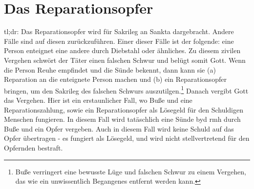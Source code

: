 \chapter{\label{app:reparationsopfer}Das Reparationsopfer}
tl;dr:
Das Reparationsopfer wird für Sakrileg an Sankta dargebracht.
Andere Fälle sind auf diesen zurückzuführen.
Einer dieser Fälle ist der folgende: eine Person enteignet eine andere durch Diebstahl oder ähnliches.
Zu diesem zivilen Vergehen schwört der Täter einen falschen Schwur und belügt somit Gott.
Wenn die Person Reuhe empfindet und die Sünde bekennt, dann kann sie (a) Reparation an die enteignete Person machen und
(b) ein Reparationsopfer bringen, um den Sakrileg des falschen Schwurs auszutilgen.\footnote{
Buße verringert eine bewusste Lüge und falschen Schwur zu einem Vergehen, das wie ein unwissentlich Begangenes entfernt werden kann.
}
Danach vergibt Gott das Vergehen.
Hier ist ein erstaunlicher Fall, wo Buße und eine Reparationszahlung, sowie ein Reparationsopfer als Lösegeld für den Schuldigen Menschen fungieren.
In diesem Fall wird tatäschlich eine Sünde byd rmh durch Buße und ein Opfer vergeben.
Auch in diesem Fall wird keine Schuld auf das Opfer übertragen - es fungiert als Lösegeld, und wird nicht stellvertretend für den Opfernden bestraft.

